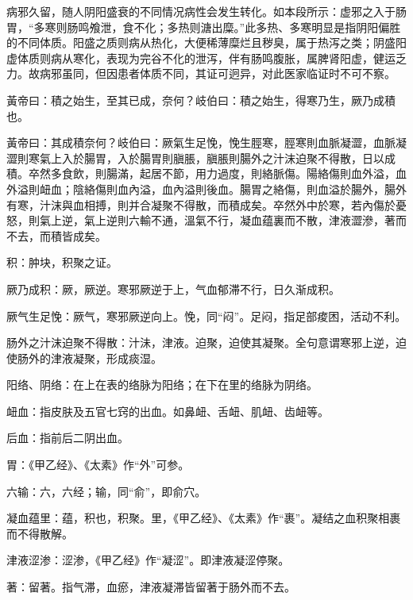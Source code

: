 \documentclass[draft,12pt]{ctexbook}
\begin{document}
病邪久留，随人阴阳盛衰的不同情况病性会发生转化。如本段所示：虚邪之入于肠胃，“多寒则肠鸣飧泄，食不化；多热则溏出糜。”此多热、多寒明显是指阴阳偏胜的不同体质。阳盛之质则病从热化，大便稀薄糜烂且秽臭，属于热泻之类；阴盛阳虚体质则病从寒化，表现为完谷不化的泄泻，伴有肠鸣腹胀，属脾肾阳虚，健运乏力。故病邪虽同，但因患者体质不同，其证可迥异，对此医家临证时不可不察。


\begin{yuanwen}
黃帝曰：積之始生，至其已成，奈何？岐伯曰：積之始生，得寒乃生，厥乃成積也。

黃帝曰：其成積奈何？岐伯曰：厥氣生足悗，悗生脛寒，脛寒則血脈凝澀，血脈凝澀則寒氣上入於腸胃，入於腸胃則䐜脹，䐜脹則腸外之汁沫迫聚不得散，日以成積。卒然多食飲，則腸滿，起居不節，用力過度，則絡脈傷。陽絡傷則血外溢，血外溢則衄血；陰絡傷則血內溢，血內溢則後血。腸胃之絡傷，則血溢於腸外，腸外有寒，汁沫與血相搏，則并合凝聚不得散，而積成矣。卒然外中於寒，若內傷於憂怒，則氣上逆，氣上逆則六輸不通，溫氣不行，凝血蕴裏而不散，津液澀滲，著而不去，而積皆成矣。
\end{yuanwen}


\begin{jiaozhu}
	\item 积：肿块，积聚之证。
	\item 厥乃成积：厥，厥逆。寒邪厥逆于上，气血郁滞不行，日久渐成积。
	\item 厥气生足悗：厥气，寒邪厥逆向上。悗，同“闷”。足闷，指足部痠困，活动不利。
	\item 肠外之汁沫迫聚不得散：汁沬，津液。迫聚，迫使其凝聚。全句意谓寒邪上逆，迫使肠外的津液凝聚，形成痰湿。
	\item 阳络、阴络：在上在表的络脉为阳络；在下在里的络脉为阴络。
	\item 衄血：指皮肤及五官七窍的出血。如鼻衄、舌衄、肌衄、齿衄等。
	\item 后血：指前后二阴出血。
	\item 胃：《甲乙经》、《太素》作“外”可参。
	\item 六输：六，六经；输，同“俞”，即俞穴。
	\item 凝血蕴里：蕴，积也，积聚。里，《甲乙经》、《太素》作“裹”。凝结之血积聚相裹而不得散解。
	\item 津液涩渗：涩渗，《甲乙经》作“凝涩”。即津液凝涩停聚。
	\item 著：留著。指气滞，血瘀，津液凝滞皆留著于肠外而不去。
\end{jiaozhu}
\end{document}
